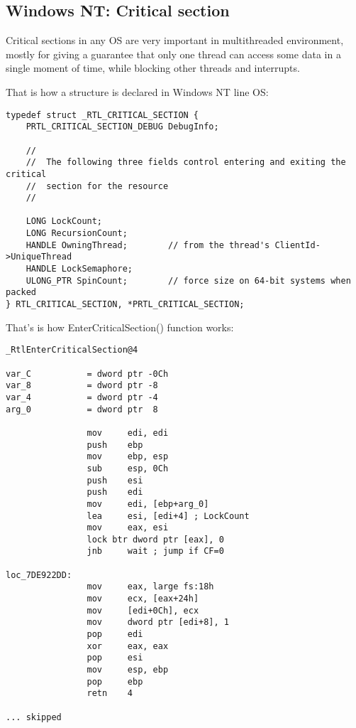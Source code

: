 \subsection{Windows NT: Critical section}

\label{critical_sections}


Critical sections in any \ac{OS} are very important in multithreaded environment,
mostly for giving a guarantee
that only one thread can access some data in a single moment of time, 
while blocking other threads and interrupts.

\par
That is how a  
structure is declared in \gls{Windows NT} line OS:

\begin{lstlisting}[caption=(Windows Research Kernel v1.2) public/sdk/inc/nturtl.h,style=customc]
typedef struct _RTL_CRITICAL_SECTION {
    PRTL_CRITICAL_SECTION_DEBUG DebugInfo;

    //
    //  The following three fields control entering and exiting the critical
    //  section for the resource
    //

    LONG LockCount;
    LONG RecursionCount;
    HANDLE OwningThread;        // from the thread's ClientId->UniqueThread
    HANDLE LockSemaphore;
    ULONG_PTR SpinCount;        // force size on 64-bit systems when packed
} RTL_CRITICAL_SECTION, *PRTL_CRITICAL_SECTION;
\end{lstlisting}

That's is how EnterCriticalSection() function works:

\begin{lstlisting}[caption=Windows 2008/ntdll.dll/x86 (begin),style=customasmx86]
_RtlEnterCriticalSection@4

var_C           = dword ptr -0Ch
var_8           = dword ptr -8
var_4           = dword ptr -4
arg_0           = dword ptr  8

                mov     edi, edi
                push    ebp
                mov     ebp, esp
                sub     esp, 0Ch
                push    esi
                push    edi
                mov     edi, [ebp+arg_0]
                lea     esi, [edi+4] ; LockCount
                mov     eax, esi
                lock btr dword ptr [eax], 0
                jnb     wait ; jump if CF=0

loc_7DE922DD:
                mov     eax, large fs:18h
                mov     ecx, [eax+24h]
                mov     [edi+0Ch], ecx
                mov     dword ptr [edi+8], 1
                pop     edi
                xor     eax, eax
                pop     esi
                mov     esp, ebp
                pop     ebp
                retn    4

... skipped
\end{lstlisting}

